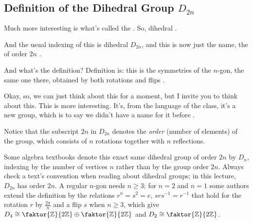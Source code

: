 \subsection{Definition of the Dihedral Group \texorpdfstring{$D_{2n}$}{D\_2n}}

\begin{speech}[00:26:09 - 00:27:14]
Much more interesting is what's called the . So, dihedral .

And the usual indexing of this is dihedral $D_{2n}$, and this is now just the name, the  of order $2n$ .

And what's the definition? Definition is: this is the symmetries of the $n$-gon, the same one there, obtained by both rotations and flips .

Okay, so, we can just think about this for a moment, but I invite you to think about this. This is more interesting. It's, from the language of the class, it's a new group, which is to say we didn't have a name for it before .
\end{speech}

\begin{content}

\begin{steps}
Notice that the subscript $2n$ in $D_{2n}$ denotes the \emph{order} (number of elements) of the group, which consists of $n$ rotations together with $n$ reflections.
\end{steps}
\end{content}

\begin{aiNote}
Some algebra textbooks denote this exact same dihedral group of order $2n$ by $D_n$, indexing by the number of vertices $n$ rather than by the group order $2n$. Always check a text's convention when reading about dihedral groups; in this lecture, $D_{2n}$ has order $2n$. A regular $n$-gon needs $n \ge 3$; for $n = 2$ and $n = 1$ some authors extend the definition by the relations $r^n = s^2 = e$, $s r s^{-1} = r^{-1}$ that hold for the rotation $r$ by $\frac{2\pi}{n}$ and a flip $s$ when $n \ge 3$, which give $D_4 \cong \faktor{\mathbb{Z}}{2\mathbb{Z}} \oplus \faktor{\mathbb{Z}}{2\mathbb{Z}}$ and $D_2 \cong \faktor{\mathbb{Z}}{2\mathbb{Z}}$.
\end{aiNote}

